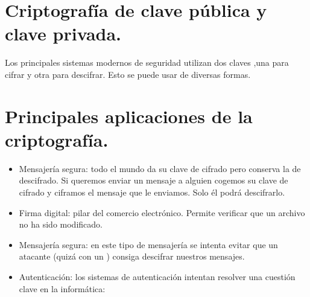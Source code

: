 \documentclass[letterpaper,10pt,spanish]{sphinxmanual}
\begin{document}
\begin{sphinxVerbatim}[commandchars=\\\{\}]
                 
           \PYG{o}{[}\PYG{o}{]} 
                  
                  
\end{sphinxVerbatim}


\section{Criptografía de clave pública y clave privada.}
\label{\detokenize{textos/tema5:criptografia-de-clave-publica-y-clave-privada}}
Los principales sistemas modernos de seguridad utilizan dos claves ,una para cifrar y otra para descifrar. Esto se puede usar de diversas formas.


\section{Principales aplicaciones de la criptografía.}
\label{\detokenize{textos/tema5:principales-aplicaciones-de-la-criptografia}}\begin{itemize}
\item {} 
Mensajería segura: todo el mundo da su clave de cifrado pero conserva la de descifrado. Si queremos enviar un mensaje a alguien cogemos su clave de cifrado y ciframos el mensaje que le enviamos. Solo él podrá descifrarlo.

\item {} 
Firma digital: pilar del comercio electrónico. Permite verificar que un archivo no ha sido modificado.

\item {} 
Mensajería segura: en este tipo de mensajería se intenta evitar que un atacante (quizá con un ) consiga descifrar nuestros mensajes.

\item {} 
Autenticación: los sistemas de autenticación intentan resolver una cuestión clave en la informática: 

\end{itemize}
\end{document}
